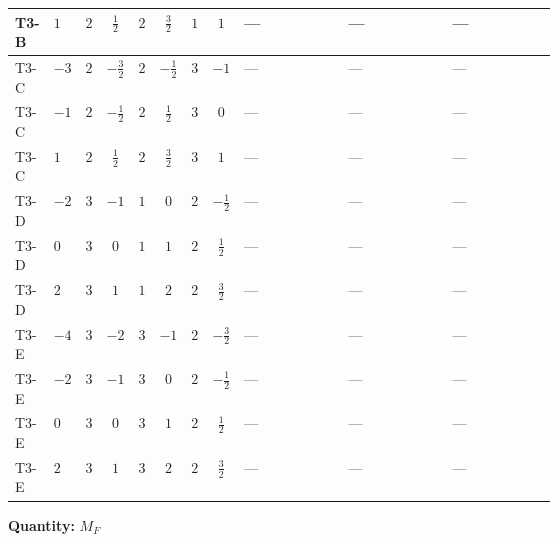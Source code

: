 \documentclass[8pt]{article}
\begin{document}
\begin{landscape}
\begin{longtable}{@{}llcccccc >{\raggedright\arraybackslash}p{0.21\linewidth} >{\raggedright\arraybackslash}p{0.21\linewidth} >{\raggedright\arraybackslash}p{0.21\linewidth}@{}}
\midrule
T3-B & $1$ & $2$ & $\frac{1}{2}$ & $2$ & $\frac{3}{2}$ & $1$ & $1$ & --- & --- & --- \\
\midrule
T3-C & $-3$ & $2$ & $-\frac{3}{2}$ & $2$ & $-\frac{1}{2}$ & $3$ & $-1$ & --- & --- & --- \\
\midrule
T3-C & $-1$ & $2$ & $-\frac{1}{2}$ & $2$ & $\frac{1}{2}$ & $3$ & $0$ & --- & --- & --- \\
\midrule
T3-C & $1$ & $2$ & $\frac{1}{2}$ & $2$ & $\frac{3}{2}$ & $3$ & $1$ & --- & --- & --- \\
\midrule
T3-D & $-2$ & $3$ & $-1$ & $1$ & $0$ & $2$ & $-\frac{1}{2}$ & --- & --- & --- \\
\midrule
T3-D & $0$ & $3$ & $0$ & $1$ & $1$ & $2$ & $\frac{1}{2}$ & --- & --- & --- \\
\midrule
T3-D & $2$ & $3$ & $1$ & $1$ & $2$ & $2$ & $\frac{3}{2}$ & --- & --- & --- \\
\midrule
T3-E & $-4$ & $3$ & $-2$ & $3$ & $-1$ & $2$ & $-\frac{3}{2}$ & --- & --- & --- \\
\midrule
T3-E & $-2$ & $3$ & $-1$ & $3$ & $0$ & $2$ & $-\frac{1}{2}$ & --- & --- & --- \\
\midrule
T3-E & $0$ & $3$ & $0$ & $3$ & $1$ & $2$ & $\frac{1}{2}$ & --- & --- & --- \\
\midrule
T3-E & $2$ & $3$ & $1$ & $3$ & $2$ & $2$ & $\frac{3}{2}$ & --- & --- & --- \\
\midrule
\bottomrule
\end{longtable}
\clearpage
\noindent\textbf{Quantity: }$M_F$\par\smallskip

\end{landscape}
\end{document}
